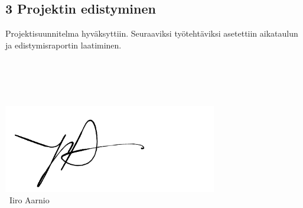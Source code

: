 \documentclass[a4paper, 12pt, finnish]{article}
\begin{document}
\subsection*{3 Projektin edistyminen}
\begin{minipage} [t] {0.4\textwidth}
    \phantom{a}
\end{minipage}
\begin{minipage} [t] {0.6\textwidth}
    Projektisuunnitelma hyväksyttiin. Seuraaviksi työtehtäviksi asetettiin aikataulun ja edistymisraportin laatiminen.
\end{minipage}
\begin{minipage} [t] {0.4\textwidth}
    \phantom{a}
\end{minipage}
\begin{minipage} [t] {0.6\textwidth}
    \phantom{a}\\\\\\\\
        \includegraphics[width=0.7\textwidth]{sign}
        \\~Iiro Aarnio
\end{minipage}
\end{document}
